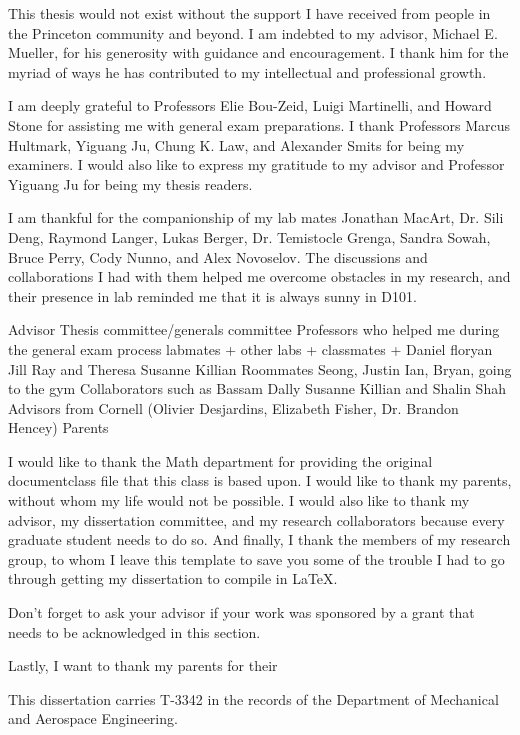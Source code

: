 This thesis would not exist without the support I have received from people in the Princeton community and beyond. I am indebted to my advisor, Michael E. Mueller, for his generosity with guidance and encouragement.  I thank him for the myriad of ways he has contributed to my intellectual and professional growth.

I am deeply grateful to Professors Elie Bou-Zeid, Luigi Martinelli, and Howard Stone for assisting me with general exam preparations. I thank Professors Marcus Hultmark, Yiguang Ju, Chung K. Law, and Alexander Smits for being my examiners. I would also like to express my gratitude to my advisor and Professor Yiguang Ju for being my thesis readers.

I am thankful for the companionship of my lab mates Jonathan MacArt, Dr. Sili Deng, Raymond Langer, Lukas Berger, Dr. Temistocle Grenga, Sandra Sowah, Bruce Perry, Cody Nunno, and Alex Novoselov. The discussions and collaborations I had with them helped me overcome obstacles in my research, and their presence in lab reminded me that it is always sunny in D101.


Advisor
Thesis committee/generals committee
Professors who helped me during the general exam process
labmates + other labs + classmates + Daniel floryan
Jill Ray and Theresa
Susanne Killian
Roommates Seong, Justin
Ian, Bryan, going to the gym
Collaborators such as Bassam Dally
Susanne Killian and Shalin Shah
Advisors from Cornell (Olivier Desjardins, Elizabeth Fisher, Dr. Brandon Hencey)
Parents

I would like to thank the Math department for providing the original documentclass file that this class is based upon. I would like to thank my parents, without whom my life would not be possible. I would also like to thank my advisor, my dissertation committee, and my research collaborators because every graduate student needs to do so. And finally, I thank the members of my research group, to whom I leave this template to save you some of the trouble I had to go through getting my dissertation to compile in \LaTeX{}.  

Don't forget to ask your advisor if your work was sponsored by a grant that needs to be acknowledged in this section.

Lastly, I want to thank my parents for their 

This dissertation carries T-3342 in the records of the Department of Mechanical and Aerospace Engineering.
